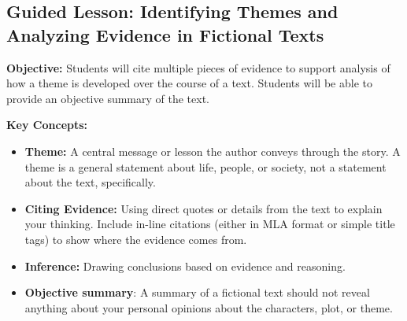 \documentclass[12pt]{article}
\begin{document}
\subsection*{Guided Lesson: Identifying Themes and Analyzing Evidence in Fictional Texts}
\onehalfspacing

\begin{tcolorbox}[colframe=black!40, colback=gray!5, 
coltitle=black, colbacktitle=black!20, fonttitle=\bfseries\Large, 
title=Learning Objective, halign title=center, left=5pt, right=5pt, top=5pt, bottom=15pt]
\textbf{Objective:} Students will cite multiple pieces of evidence to support analysis of how a theme is developed over the course of a text. Students will be able to provide an objective summary of the text.
\end{tcolorbox}

\vspace{1em}

\begin{tcolorbox}[colframe=black!60, colback=white, 
coltitle=black, colbacktitle=black!15, fonttitle=\bfseries\Large, 
title=Key Concepts and Vocabulary, halign title=center, left=10pt, right=10pt, top=10pt, bottom=15pt]
\textbf{Key Concepts:}
\begin{itemize}
    \item \textbf{Theme:} A central message or lesson the author conveys through the story. A theme is a general statement about life, people, or society, not a statement about the text, specifically.
    \item \textbf{Citing Evidence:} Using direct quotes or details from the text to explain your thinking. Include in-line citations (either in MLA format or simple title tags) to show where the evidence comes from.
    \item \textbf{Inference:} Drawing conclusions based on evidence and reasoning.
    \item \textbf{Objective summary}: A summary of a fictional text should not reveal anything about your personal opinions about the characters, plot, or theme. 
\end{itemize}
\end{tcolorbox}

\vspace{1em}
\end{document}
